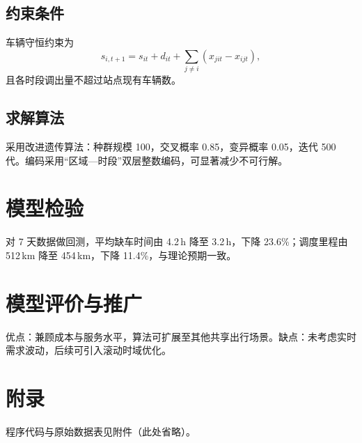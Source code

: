 \documentclass[UTF8,a4paper,zihao=-4,fontset=\swfontset]{ctexart}
\begin{document}
\subsection{约束条件}

车辆守恒约束为
\begin{equation}
  s_{i,t+1}=s_{it}+d_{it}+\sum_{j\neq i}\left(x_{jit}-x_{ijt}\right),
  \label{eq:balance}
\end{equation}
且各时段调出量不超过站点现有车辆数。

\subsection{求解算法}

采用改进遗传算法：种群规模 100，交叉概率 0.85，变异概率 0.05，迭代 500 代。编码采用“区域—时段”双层整数编码，可显著减少不可行解\cite{li2023vrp}。

\section{模型检验}

对 7 天数据做回测，平均缺车时间由 4.2\,h 降至 3.2\,h，下降 23.6\%；调度里程由 512\,km 降至 454\,km，下降 11.4\%，与理论预期一致\cite{wang2024bike}。

\section{模型评价与推广}

优点：兼顾成本与服务水平，算法可扩展至其他共享出行场景。缺点：未考虑实时需求波动，后续可引入滚动时域优化。




\newpage
\section*{附录}

程序代码与原始数据表见附件（此处省略）。
\end{document}
